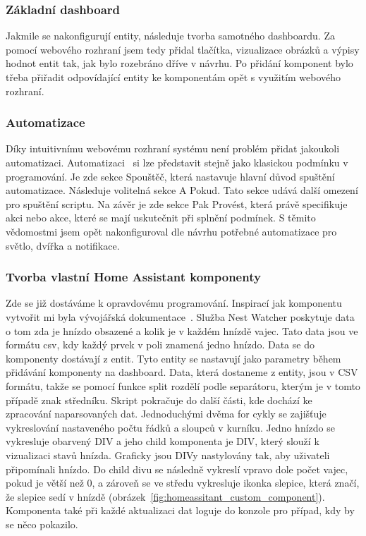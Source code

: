 \subsubsection*{Základní dashboard}
Jakmile se nakonfigurují entity, následuje tvorba samotného dashboardu.
Za pomocí webového rozhraní jsem tedy přidal tlačítka, vizualizace obrázků a výpisy hodnot entit tak, jak bylo rozebráno dříve v návrhu.
Po přidání komponent bylo třeba přiřadit odpovídající entity ke komponentám opět s využitím webového rozhraní.

\subsubsection*{Automatizace}
Díky intuitivnímu webovému rozhraní systému není problém přidat jakoukoli automatizaci.
Automatizaci~\cite{HomeAssistantAutomations} si lze představit stejně jako klasickou podmínku v programování.
Je zde sekce Spouštěč, která nastavuje hlavní důvod spuštění automatizace.
Následuje volitelná sekce A Pokud.
Tato sekce udává další omezení pro spuštění scriptu.
Na závěr je zde sekce Pak Provést, která právě specifikuje akci nebo akce, které se mají uskutečnit při splnění podmínek.
S těmito vědomostmi jsem opět nakonfiguroval dle návrhu potřebné automatizace pro světlo, dvířka a notifikace.

\subsubsection*{Tvorba vlastní Home Assistant komponenty}
Zde se již dostáváme k opravdovému programování.
Inspirací jak komponentu vytvořit mi byla vývojářská dokumentace~\cite{homeassistant-developers,HomeAssistantCustomCards}.
Služba Nest Watcher poskytuje data o tom zda je hnízdo obsazené a kolik je v každém hnízdě vajec.
Tato data jsou ve formátu \gls{csv}, kdy každý prvek v poli znamená jedno hnízdo.
Data se do komponenty dostávají z entit.
Tyto entity se nastavují jako parametry během přidávání komponenty na dashboard.
Data, která dostaneme z entity, jsou v CSV formátu, takže se pomocí funkce split rozdělí podle separátoru, kterým je v tomto případě znak středníku.
Skript pokračuje do další části, kde dochází ke zpracování naparsovaných dat.
Jednoduchými dvěma for cykly se zajišťuje vykreslování nastaveného počtu řádků a sloupců v kurníku.
Jedno hnízdo se vykresluje obarvený DIV a jeho child komponenta je DIV, který slouží k vizualizaci stavů hnízda.
Graficky jsou DIVy nastylovány tak, aby uživateli připomínali hnízdo.
Do child divu se následně vykreslí vpravo dole počet vajec, pokud je větší než 0, a zároveň se ve středu vykresluje ikonka slepice, která značí, že slepice sedí v hnízdě (obrázek~\ref{fig:homeassitant_custom_component}).
Komponenta také při každé aktualizaci dat loguje do konzole pro případ, kdy by se něco pokazilo.

